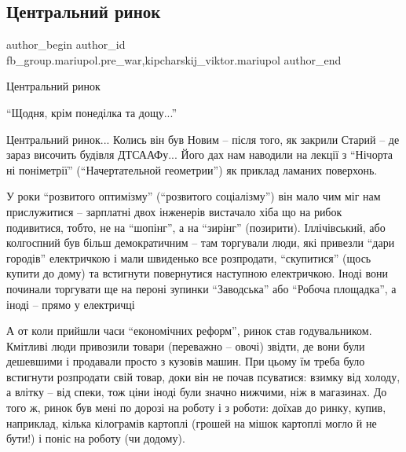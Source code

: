  
 
 
 
 

\subsection{Центральний ринок}
\label{sec:18_02_2023.fb.fb_group.mariupol.pre_war.1.tsentralnii_rinok}
 
\ifcmt
 author_begin
   author_id fb_group.mariupol.pre_war,kipcharskij_viktor.mariupol
 author_end
\fi

Центральний ринок

\enquote{Щодня, крім понеділка та дощу...}

Центральний ринок... Колись він був Новим – після того, як закрили Старий – де
зараз височить будівля ДТСААФу... Його дах нам наводили на лекції з \enquote{Нічорта ні
поніметрії} (\enquote{Начертательной геометрии}) як приклад ламаних поверхонь.

У роки \enquote{розвитого оптимізму} (\enquote{розвитого соціалізму}) він мало чим міг нам
прислужитися – зарплатні двох інженерів вистачало хіба що на рибок подивитися,
тобто, не на \enquote{шопінг}, а на \enquote{зирінг} (позирити). Іллічівський, або колгоспний
був більш демократичним – там торгували люди, які привезли \enquote{дари городів}
електричкою і мали швиденько все розпродати, \enquote{скупитися} (щось купити до дому)
та встигнути повернутися наступною електричкою. Іноді вони починали торгувати
ще на пероні зупинки \enquote{Заводська} або \enquote{Робоча площадка}, а іноді – прямо у
електричці  

А от коли прийшли часи \enquote{економічних реформ}, ринок став годувальником.
Кмітливі люди привозили товари (переважно – овочі)  звідти, де вони були
дешевшими і продавали просто з кузовів машин. При цьому їм треба було встигнути
розпродати свій товар, доки він не почав псуватися: взимку від холоду, а влітку
– від спеки, тож ціни іноді були значно нижчими, ніж в магазинах. До того ж,
ринок був мені по дорозі на роботу і з роботи: доїхав до ринку, купив,
наприклад, кілька кілограмів картоплі (грошей на мішок картоплі могло й не
бути!) і поніс на роботу (чи додому). 

